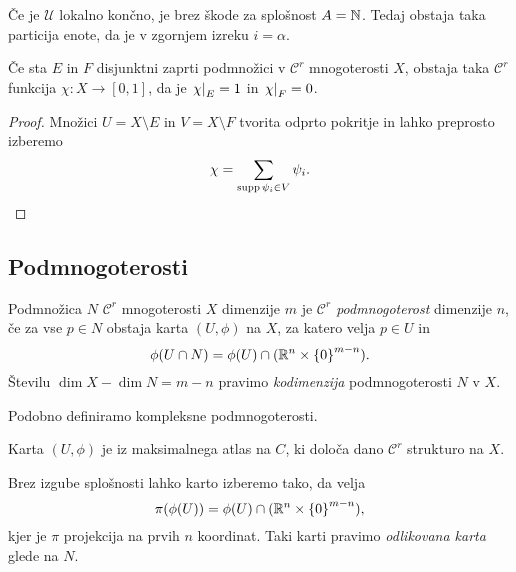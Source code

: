 \begin{opomba}
Če je $\mathcal{U}$ lokalno končno, je brez škode za splošnost
$A = \mathbb{N}$. Tedaj obstaja taka particija enote, da je v zgornjem
izreku $i = \alpha$.
\end{opomba}

\begin{posledica}
Če sta $E$ in $F$ disjunktni zaprti podmnožici v $\mathcal{C}^r$
mnogoterosti $X$, obstaja taka $\mathcal{C}^r$ funkcija
$\chi \colon X \to [0,1]$, da je $\left. \chi\right|_{E}^{} = 1$ in
$\left. \chi\right|_{F}^{} = 0$.
\end{posledica}

\begin{proof}
Množici $U = X \setminus E$ in $V = X \setminus F$ tvorita odprto
pokritje in lahko preprosto izberemo
\[
\chi = \sum_{\operatorname{supp} \psi_i \in V} \psi_i. \qedhere
\]
\end{proof}

\newpage

\subsection{Podmnogoterosti}


\begin{definicija}
Podmnožica $N$ $\mathcal{C}^r$ mnogoterosti $X$ dimenzije $m$ je
\emph{$\mathcal{C}^r$ podmnogoterost}
dimenzije $n$, če za vse $p \in N$ obstaja karta $(U, \phi)$ na
$X$, za katero velja $p \in U$ in
\[
\phi(U \cap N) = \phi(U) \cap (\mathbb{R}^n \times \left\{0\right\}^{m-n}).
\]
Številu $\dim X - \dim N = m - n$ pravimo
\emph{kodimenzija}
podmnogoterosti $N$ v $X$.
\end{definicija}

\begin{opomba}
Podobno definiramo kompleksne podmnogoterosti.
\end{opomba}

\begin{opomba}
Karta $(U, \phi)$ je iz maksimalnega atlas na $C$, ki določa dano
$\mathcal{C}^r$ strukturo na $X$.
\end{opomba}

\begin{opomba}
Brez izgube splošnosti lahko karto izberemo tako, da velja
\[
\pi(\phi(U)) = \phi(U) \cap (\mathbb{R}^n \times \left\{0\right\}^{m-n}),
\]
kjer je $\pi$ projekcija na prvih $n$ koordinat. Taki karti pravimo
\emph{odlikovana karta} glede na $N$.
\end{opomba}

